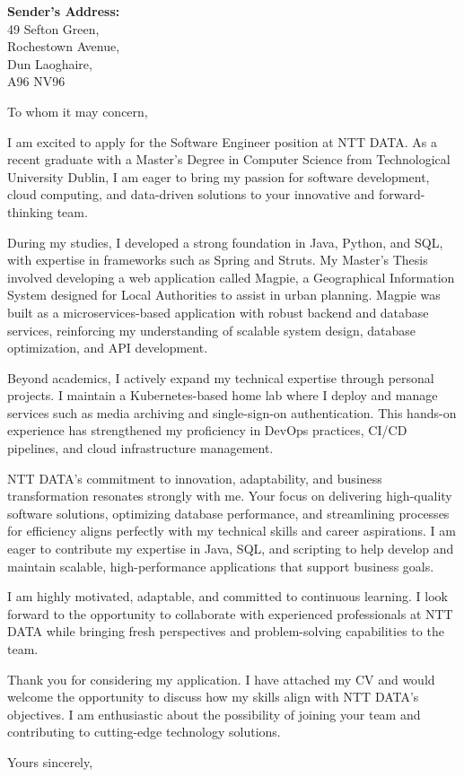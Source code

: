 \documentclass[11pt]{letter}
\begin{document}
\begin{letter}{}

\noindent\textbf{Sender's Address:} \\
49 Sefton Green, \\
Rochestown Avenue, \\
Dun Laoghaire, \\
A96 NV96 \\

\opening{To whom it may concern,}

I am excited to apply for the Software Engineer position at NTT DATA. As a
recent graduate with a Master’s Degree in Computer Science from Technological
University Dublin, I am eager to bring my passion for software development,
cloud computing, and data-driven solutions to your innovative and
forward-thinking team.

During my studies, I developed a strong foundation in Java, Python, and SQL,
with expertise in frameworks such as Spring and Struts. My Master's Thesis
involved developing a web application called Magpie, a Geographical Information
System designed for Local Authorities to assist in urban planning. Magpie was
built as a microservices-based application with robust backend and database
services, reinforcing my understanding of scalable system design, database
optimization, and API development.

Beyond academics, I actively expand my technical expertise through personal
projects. I maintain a Kubernetes-based home lab where I deploy and manage
services such as media archiving and single-sign-on authentication. This
hands-on experience has strengthened my proficiency in DevOps practices, CI/CD
pipelines, and cloud infrastructure management.

NTT DATA’s commitment to innovation, adaptability, and business transformation
resonates strongly with me. Your focus on delivering high-quality software
solutions, optimizing database performance, and streamlining processes for
efficiency aligns perfectly with my technical skills and career aspirations. I
am eager to contribute my expertise in Java, SQL, and scripting to help develop
and maintain scalable, high-performance applications that support business
goals.

I am highly motivated, adaptable, and committed to continuous learning. I look
forward to the opportunity to collaborate with experienced professionals at NTT
DATA while bringing fresh perspectives and problem-solving capabilities to the
team.

Thank you for considering my application. I have attached my CV and would
welcome the opportunity to discuss how my skills align with NTT DATA’s
objectives. I am enthusiastic about the possibility of joining your team and
contributing to cutting-edge technology solutions.

\closing{Yours sincerely,}

\end{letter}
\end{document}
